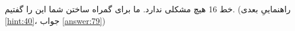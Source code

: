 \section{}
\paragraph{}\label{hint:275}
خط 16 هیچ مشکلی ندارد. ما برای گمراه ساختن شما این را گفتیم. (راهنماییِ بعدی \ref{hint:40}، جواب \ref{answer:79})
